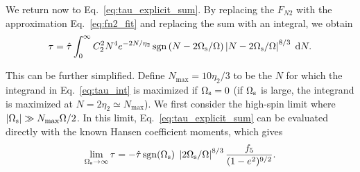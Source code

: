 \documentclass[
        fleqn,
        usenatbib,
    ]{mnras}
\newcommand*{\abs}[1]{\left|#1\right|}
\DeclareMathOperator*{\sgn}{sgn}
\begin{document}
We return now to Eq.~\eqref{eq:tau_explicit_sum}. By replacing the $F_{N2}$ with
the approximation Eq.~\eqref{eq:fn2_fit} and replacing the sum with an integral,
we obtain
\begin{equation}
    \tau = \hat{\tau} \int_0^\infty C_2^2 N^4 e^{-2N / \eta_2}
        \sgn\left(N - 2\Omega_{\rm s} / \Omega\right) \left|N - 2 \Omega_{\rm s} /
            \Omega\right|^{8/3}\;\mathrm{d}N.\label{eq:tau_int}
\end{equation}

This can be further simplified. Define $N_{\max} = 10\eta_2/3$ to be the $N$ for
which the integrand in Eq.~\eqref{eq:tau_int} is maximized if
$\Omega_{\rm s} = 0$ (if $\Omega_{\rm s}$ is large, the integrand is maximized
at $N = 2\eta_2 \simeq N_{\max}$). We first consider the high-spin limit where
$\abs{\Omega_{\rm s}} \gg N_{\max}\Omega / 2$. In this limit,
Eq.~\eqref{eq:tau_explicit_sum} can be evaluated directly with the known Hansen
coefficient moments, which gives
\begin{equation}
    \lim_{\Omega_{\rm s} \to \infty} \tau = -\hat{\tau} \sgn (\Omega_{\rm s})\;\left|2
        \Omega_{\rm s} / \Omega\right|^{8/3} \frac{f_5}{(1 -
        e^2)^{9/2}}.\label{eq:tau_highspin}
\end{equation}
\end{document}
